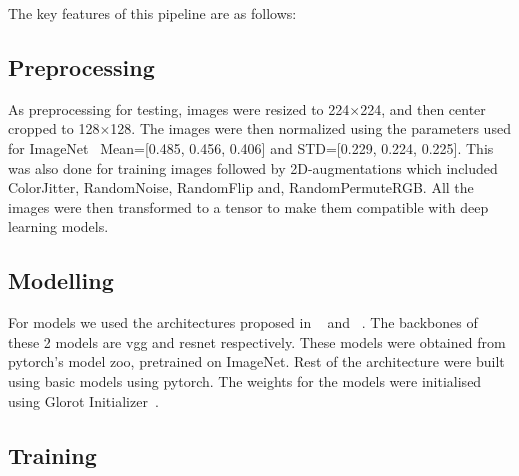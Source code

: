 The key features of this pipeline are as follows:

\subsection{Preprocessing}\label{subsec:preprocessing}
As preprocessing for testing, images were resized to 224$\times$224, and then center cropped to 128$\times$128.
The images were then normalized using the parameters used for ImageNet~\cite{Deng2009ImageNetAL} Mean=[0.485, 0.456, 0.406] and STD=[0.229, 0.224, 0.225].
This was also done for training images followed by 2D-augmentations which included ColorJitter, RandomNoise, RandomFlip and, RandomPermuteRGB\@.
All the images were then transformed to a tensor to make them compatible with deep learning models.

\subsection{Modelling}\label{subsec:modelling}
For models we used the architectures proposed in ~\cite{Xie_2019} and ~\cite{Xie_2020}.
The backbones of these 2 models are \gls{vgg} and \gls{resnet} respectively.
These models were obtained from pytorch's model zoo, pretrained on ImageNet.
Rest of the architecture were built using basic models using pytorch.
The weights for the models were initialised using Glorot Initializer~\cite{Glorot2010UnderstandingTD}.

\subsection{Training}\label{subsec:training}

